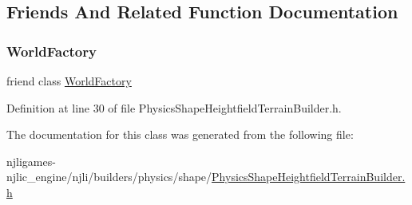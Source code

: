 \subsection{Friends And Related Function Documentation}
\mbox{\label{classnjli_1_1_physics_shape_heightfield_terrain_builder_acb96ebb09abe8f2a37a915a842babfac}} 
\subsubsection{\texorpdfstring{World\+Factory}{WorldFactory}}
{\footnotesize\ttfamily friend class \mbox{\hyperlink{classnjli_1_1_world_factory}{World\+Factory}}\hspace{0.3cm}{\ttfamily [friend]}}



Definition at line 30 of file Physics\+Shape\+Heightfield\+Terrain\+Builder.\+h.



The documentation for this class was generated from the following file\+:\begin{DoxyCompactItemize}
\item 
njligames-\/njlic\+\_\+engine/njli/builders/physics/shape/\mbox{\hyperlink{_physics_shape_heightfield_terrain_builder_8h}{Physics\+Shape\+Heightfield\+Terrain\+Builder.\+h}}\end{DoxyCompactItemize}
